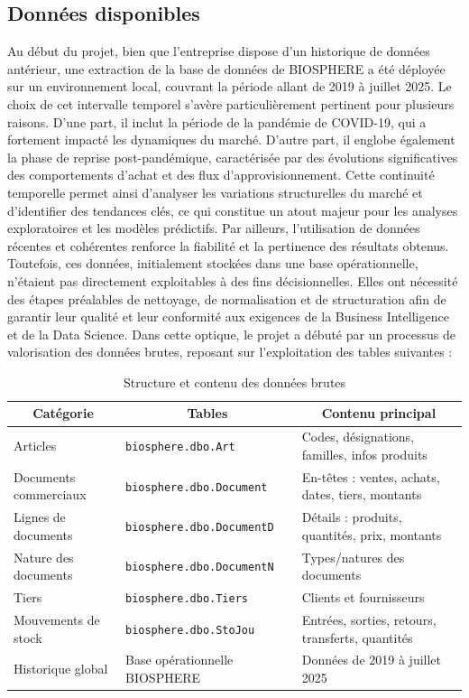 \subsection{Données disponibles}
Au début du projet, bien que l’entreprise dispose d’un historique de données antérieur, une extraction de la base de données de BIOSPHERE a été déployée sur un environnement local, couvrant la période allant de 2019 à juillet 2025. Le choix de cet intervalle temporel s’avère particulièrement pertinent pour plusieurs raisons. D’une part, il inclut la période de la pandémie de COVID-19, qui a fortement impacté les dynamiques du marché. D’autre part, il englobe également la phase de reprise post-pandémique, caractérisée par des évolutions significatives des comportements d’achat et des flux d’approvisionnement. Cette continuité temporelle permet ainsi d’analyser les variations structurelles du marché et d’identifier des tendances clés, ce qui constitue un atout majeur pour les analyses exploratoires et les modèles prédictifs. Par ailleurs, l’utilisation de données récentes et cohérentes renforce la fiabilité et la pertinence des résultats obtenus.
Toutefois, ces données, initialement stockées dans une base opérationnelle, n’étaient pas directement exploitables à des fins décisionnelles. Elles ont nécessité des étapes préalables de nettoyage, de normalisation et de structuration afin de garantir leur qualité et leur conformité aux exigences de la Business Intelligence et de la Data Science.
Dans cette optique, le projet a débuté par un processus de valorisation des données brutes, reposant sur l’exploitation des tables suivantes :


\begin{table}[H]
\centering
\caption{Structure et contenu des données brutes}
\label{tab:ch1:donnees}
\begin{tabular}{|p{5cm}|p{5cm}|p{5.5cm}|}
\hline
\multicolumn{1}{|c|}{\textbf{Catégorie}} & 
\multicolumn{1}{c|}{\textbf{Tables}} & 
\multicolumn{1}{c|}{\textbf{Contenu principal}} \\
\hline
Articles & \texttt{biosphere.dbo.Art} & Codes, désignations, familles, infos produits \\ \hline
Documents commerciaux & \texttt{biosphere.dbo.Document} & En-têtes : ventes, achats, dates, tiers, montants \\ \hline
Lignes de documents & \texttt{biosphere.dbo.DocumentD} & Détails : produits, quantités, prix, montants \\ \hline
Nature des documents & \texttt{biosphere.dbo.DocumentN} & Types/natures des documents \\ \hline
Tiers & \texttt{biosphere.dbo.Tiers} & Clients et fournisseurs \\ \hline
Mouvements de stock & \texttt{biosphere.dbo.StoJou} & Entrées, sorties, retours, transferts, quantités \\ \hline
Historique global & Base opérationnelle BIOSPHERE & Données de 2019 à juillet 2025 \\ \hline
\end{tabular}
\end{table}

